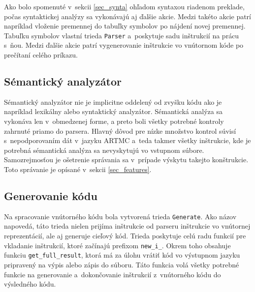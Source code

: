 Ako bolo spomenuté v~sekcii \ref{sec_synta} ohľadom syntaxou riadenom preklade, počas syntaktickej analýzy sa vykonávajú aj ďalšie akcie. Medzi takéto akcie patrí napríklad vloženie premennej do tabuľky symbolov po nájdení novej premennej. Tabuľku symbolov vlastní trieda \texttt{Parser} a~poskytuje sadu inštrukcií na prácu s~ňou. Medzi ďalšie akcie patrí vygenerovanie inštrukcie vo vnútornom kóde po prečítaní celého príkazu. 

\subsection{Sémantický analyzátor}
Sémantický analyzátor nie je implicitne oddelený od zvyšku kódu ako je napríklad lexikálny alebo syntaktický analyzátor. Sémantická analýza sa vykonáva len v~obmedzenej forme, a preto boli všetky potrebné kontroly zahrnuté priamo do parsera. Hlavný dôvod pre nízke množstvo kontrol súvisí s~nepodporovaním dát v~jazyku ARTMC a~teda takmer všetky inštrukcie, kde je potrebná sémantická analýza sa nevyskytujú vo vstupnom súbore. Samozrejmosťou je ošetrenie správania sa v~prípade výskytu takejto konštrukcie. Toto správanie je opísané v~sekcii \ref{sec_features}.

\subsection{Generovanie kódu}
Na spracovanie vnútorného kódu bola vytvorená trieda \texttt{Generate}. Ako názov napovedá, táto trieda nielen prijíma inštrukcie od parseru inštrukcie vo vnútornej reprezentácií, ale aj generuje cieľový kód. Trieda poskytuje celú radu funkcií pre vkladanie inštrukcií, ktoré začínajú prefixom \texttt{new\_i\_}. Okrem toho obsahuje funkciu \texttt{get\_full\_result}, ktorá má za úlohu vrátiť kód vo výstupnom jazyku pripravený na výpis alebo zápis do súboru. Táto funkcia volá všetky potrebné funkcie na generovanie a~dokončovanie inštrukcií z~vnútorného kódu do výsledného kódu.

